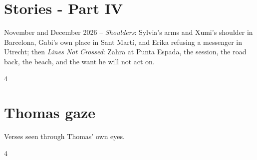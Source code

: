 \documentclass[a4paper,landscape]{memoir}
\begin{document}
\chapter{Stories - Part IV}
November and December 2026 -- \emph{Shoulders}: Sylvia's arms and Xumi's shoulder in Barcelona, Gabi's own place in Sant Mart\'i, %
and Erika refusing a messenger in Utrecht; then \emph{Lines Not Crossed}: Zahra at Punta Espada, the session, the road back, the beach, and the want he will not act on.
\clearpage\begin{multicols*}{4}
\end{multicols*}

\chapter{Thomas gaze}
Verses seen through Thomas' own eyes.
\clearpage\begin{multicols*}{4}
\end{multicols*}
\end{document}
